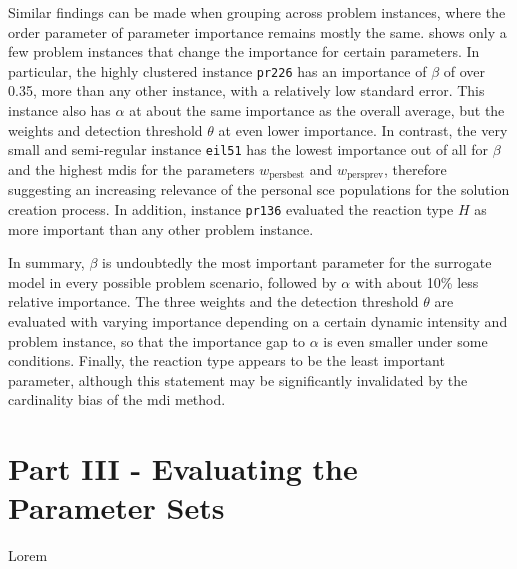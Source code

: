 Similar findings can be made when grouping across problem instances, where the order parameter of parameter importance remains mostly the same.  shows only a few problem instances that change the importance for certain parameters. In particular, the highly clustered instance \texttt{pr226} has an importance of $\beta$ of over 0.35, more than any other instance, with a relatively low standard error. This instance also has $\alpha$ at about the same importance as the overall average, but the weights and detection threshold $\theta$ at even lower importance. In contrast, the very small and semi-regular instance \texttt{eil51} has the lowest importance out of all for $\beta$ and the highest \glspl{mdi} for the parameters $w_{\text{persbest}}$ and $w_{\text{persprev}}$, therefore suggesting an increasing relevance of the personal \gls{sce} populations for the solution creation process. In addition, instance \texttt{pr136} evaluated the reaction type $H$ as more important than any other problem instance. 

In summary, $\beta$ is undoubtedly the most important parameter for the surrogate model in every possible problem scenario, followed by $\alpha$ with about 10\% less relative importance. The three weights and the detection threshold $\theta$ are evaluated with varying importance depending on a certain dynamic intensity and problem instance, so that the importance gap to $\alpha$ is even smaller under some conditions. Finally, the reaction type appears to be the least important parameter, although this statement may be significantly invalidated by the cardinality bias of the \gls{mdi} method. 

\section{Part III - Evaluating the Parameter Sets}
Lorem
